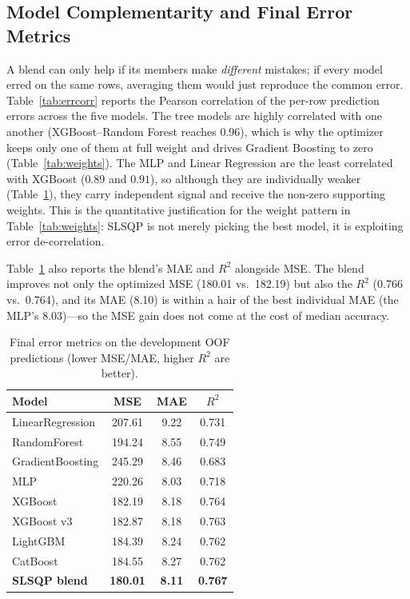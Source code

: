 \documentclass[journal]{IEEEtran}
\begin{document}
\subsection{Model Complementarity and Final Error Metrics}
\label{sec:complementarity}
A blend can only help if its members make \emph{different} mistakes; if every
model erred on the same rows, averaging them would just reproduce the common
error. Table~\ref{tab:errcorr} reports the Pearson correlation of the per-row
prediction errors across the five models. The tree models are highly correlated
with one another (XGBoost--Random Forest reaches $0.96$), which is why the
optimizer keeps only one of them at full weight and drives Gradient Boosting to
zero (Table~\ref{tab:weights}). The MLP and Linear Regression are the least
correlated with XGBoost ($0.89$ and $0.91$), so although they are individually
weaker (Table~\ref{tab:metrics}), they carry independent signal and receive the
non-zero supporting weights. This is the quantitative justification for the
weight pattern in Table~\ref{tab:weights}: SLSQP is not merely picking the best
model, it is exploiting error de-correlation.

Table~\ref{tab:metrics} also reports the blend's MAE and $R^2$ alongside MSE.
The blend improves not only the optimized MSE (180.01 vs.\ 182.19) but also the
$R^2$ (0.766 vs.\ 0.764), and its MAE (8.10) is within a hair of the best
individual MAE (the MLP's 8.03)---so the MSE gain does not come at the cost of
median accuracy.

\begin{table}[!t]
\caption{Final error metrics on the development OOF predictions (lower MSE/MAE,
higher $R^2$ are better).}
\label{tab:metrics}
\centering
\begin{tabular}{lccc}
\toprule
Model & MSE & MAE & $R^2$ \\
\midrule
LinearRegression & 207.61 & 9.22 & 0.731 \\
RandomForest & 194.24 & 8.55 & 0.749 \\
GradientBoosting & 245.29 & 8.46 & 0.683 \\
MLP & 220.26 & 8.03 & 0.718 \\
XGBoost & 182.19 & 8.18 & 0.764 \\
XGBoost v3 & 182.87 & 8.18 & 0.763 \\
LightGBM & 184.39 & 8.24 & 0.762 \\
CatBoost & 184.55 & 8.27 & 0.762 \\
\textbf{SLSQP blend} & \textbf{180.01} & \textbf{8.11} & \textbf{0.767} \\
\bottomrule
\end{tabular}
\end{table}
\end{document}
